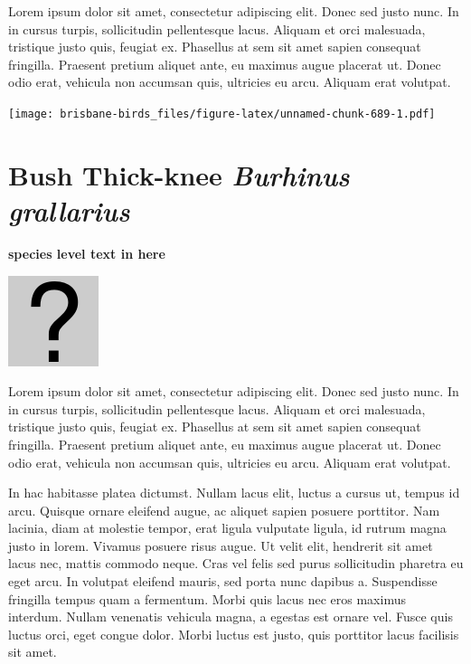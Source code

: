 \documentclass[]{book}
\let\origfigure\figure
\let\endorigfigure\endfigure
\renewenvironment{figure}[1][2] {
  \expandafter\origfigure\expandafter[H]
} {
  \endorigfigure
}
\begin{document}
Lorem ipsum dolor sit amet, consectetur adipiscing elit. Donec sed justo
nunc. In in cursus turpis, sollicitudin pellentesque lacus. Aliquam et
orci malesuada, tristique justo quis, feugiat ex. Phasellus at sem sit
amet sapien consequat fringilla. Praesent pretium aliquet ante, eu
maximus augue placerat ut. Donec odio erat, vehicula non accumsan quis,
ultricies eu arcu. Aliquam erat volutpat.

\texttt{[image: brisbane-birds\_files/figure-latex/unnamed-chunk-689-1.pdf]}

\section{\texorpdfstring{Bush Thick-knee \emph{Burhinus
grallarius}}{Bush Thick-knee Burhinus grallarius}}\label{bush-thick-knee-burhinus-grallarius}

\textbf{species level text in here}

\begin{figure}
\centering
\includegraphics{assets/missing.png}
\caption{No image for species}
\end{figure}

Lorem ipsum dolor sit amet, consectetur adipiscing elit. Donec sed justo
nunc. In in cursus turpis, sollicitudin pellentesque lacus. Aliquam et
orci malesuada, tristique justo quis, feugiat ex. Phasellus at sem sit
amet sapien consequat fringilla. Praesent pretium aliquet ante, eu
maximus augue placerat ut. Donec odio erat, vehicula non accumsan quis,
ultricies eu arcu. Aliquam erat volutpat.

In hac habitasse platea dictumst. Nullam lacus elit, luctus a cursus ut,
tempus id arcu. Quisque ornare eleifend augue, ac aliquet sapien posuere
porttitor. Nam lacinia, diam at molestie tempor, erat ligula vulputate
ligula, id rutrum magna justo in lorem. Vivamus posuere risus augue. Ut
velit elit, hendrerit sit amet lacus nec, mattis commodo neque. Cras vel
felis sed purus sollicitudin pharetra eu eget arcu. In volutpat eleifend
mauris, sed porta nunc dapibus a. Suspendisse fringilla tempus quam a
fermentum. Morbi quis lacus nec eros maximus interdum. Nullam venenatis
vehicula magna, a egestas est ornare vel. Fusce quis luctus orci, eget
congue dolor. Morbi luctus est justo, quis porttitor lacus facilisis sit
amet.
\end{document}
